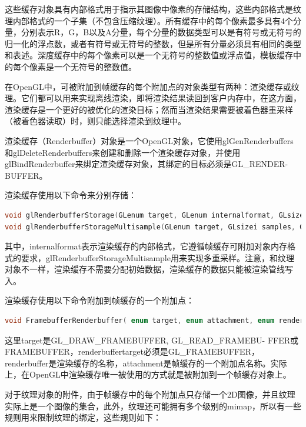 这些缓存对象具有内部格式用于指示其图像中像素的存储结构，这些内部格式是纹理内部格式的一个子集（不包含压缩纹理）。所有缓存中的每个像素最多具有4个分量，分别表示R，G，B以及A分量，每个分量的数据类型可以是有符号或无符号的归一化的浮点数，或者有符号或无符号的整数，但是所有分量必须具有相同的类型和表述。深度缓存中的每个像素可以是一个无符号的整数值或浮点值，模板缓存中的每个像素是一个无符号的整数值。

在OpenGL中，可被附加到帧缓存的每个附加点的对象类型有两种：渲染缓存或纹理。它们都可以用来实现离线渲染，即将渲染结果读回到客户内存中，在这方面，渲染缓存是一个更好的被优化的渲染目标；然而当渲染结果需要被着色器重采样（被着色器读取）时，则只能选择渲染到纹理中。

渲染缓存（Renderbuffer）对象是一个OpenGL对象，它使用glGenRenderbuffers和glDeleteRenderbuffers​来创建和删除一个渲染缓存对象，并使用glBindRenderbuffer来绑定渲染缓存对象，其绑定的目标必须是GL\_RENDER- BUFFER。

渲染缓存使用以下命令来分别存储：

\begin{lstlisting}[language=C++]
void glRenderbufferStorage​(GLenum target​, GLenum internalformat​, GLsizei width​, GLsizei height​);
void glRenderbufferStorageMultisample​(GLenum target​, GLsizei samples​, GLenum internalformat​, GLsizei width​, GLsizei height​);
\end{lstlisting}

其中，internalformat表示渲染缓存的内部格式，它遵循帧缓存可附加对象内存格式的要求，glRenderbufferStorageMultisample用来实现多重采样。注意，和纹理对象不一样，渲染缓存不需要分配初始数据，渲染缓存的数据只能被渲染管线写入。

渲染缓存使用以下命令附加到帧缓存的一个附加点：

\begin{lstlisting}[language=C++]
void FramebufferRenderbuffer( enum target, enum attachment, enum renderbuffertarget, uint renderbuffer );
\end{lstlisting}

这里target是GL\_DRAW\_FRAMEBUFFER, GL\_READ\_FRAMEBU- FFER或FRAMEBUFFER，renderbuffertarget必须是GL\_FRAMEBUFFER，renderbuffer是渲染缓存的名称，attachment是帧缓存的一个附加点名称。实际上，在OpenGL中渲染缓存唯一被使用的方式就是被附加到一个帧缓存对象上。

对于纹理对象的附件，由于帧缓存中的每个附加点只存储一个2D图像，并且纹理实际上是一个图像的集合，此外，纹理还可能拥有多个级别的mimap，所以有一些规则用来限制纹理的绑定，这些规则如下：

